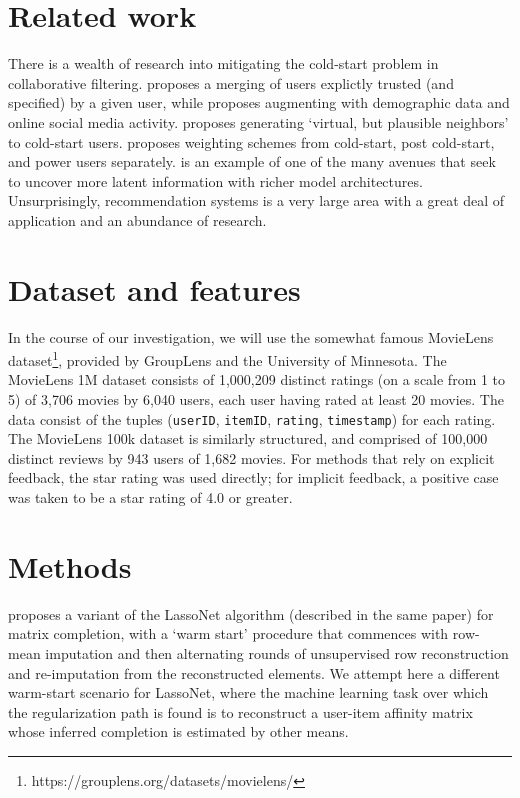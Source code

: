 \documentclass{article}
\begin{document}
\section{Related work}

There is a wealth of research into mitigating the cold-start problem in
collaborative filtering. \cite{guo2014merging} proposes a merging of
users explictly trusted (and specified) by a given user, while
\cite{sedhain2014social} proposes augmenting with demographic data and
online social media activity. \cite{chae2020ar} proposes generating
`virtual, but plausible neighbors' to cold-start users.
\cite{said2012analyzing} proposes weighting schemes from cold-start,
post cold-start, and power users separately. \cite{wei2017collaborative}
is an example of one of the many avenues that seek to uncover more
latent information with richer model architectures.  Unsurprisingly,
recommendation systems is a very large area with a great deal of
application and an abundance of research.

\section{Dataset and features}

In the course of our investigation, we will use the somewhat famous
MovieLens dataset\footnote{https://grouplens.org/datasets/movielens/},
provided by GroupLens and the University of Minnesota.  The MovieLens 1M
dataset consists of 1,000,209 distinct ratings (on a scale from 1 to 5)
of 3,706 movies by 6,040 users, each user having rated at least 20
movies. The data consist of the tuples (\texttt{userID},
\texttt{itemID}, \texttt{rating}, \texttt{timestamp}) for each rating.
The MovieLens 100k dataset is similarly structured, and comprised of
100,000 distinct reviews by 943 users of 1,682 movies.  For methods that
rely on explicit feedback, the star rating was used directly; for implicit
feedback, a positive case was taken to be a star rating of 4.0
or greater.

\section{Methods}

\cite{lemhadri_lassonet_2021} proposes a variant of the LassoNet
algorithm (described in the same paper) for matrix completion, with a
`warm start' procedure that commences with row-mean imputation and then
alternating rounds of unsupervised row reconstruction and re-imputation from
the reconstructed elements.  We attempt here a different warm-start scenario
for LassoNet, where the machine learning task over which the regularization
path is found is to reconstruct a user-item affinity matrix whose inferred
completion is estimated by other means.
\end{document}
